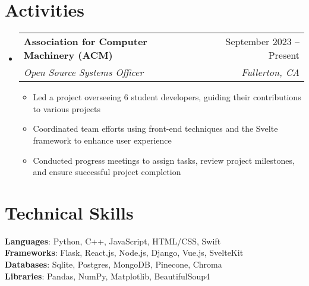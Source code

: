 \documentclass[letterpaper,11pt]{article}
\makeatletter
\newcommand{\resumeItem}[1]{
  \item\small{
    {#1 \vspace{-2pt}}
  }
}
\newcommand{\resumeSubheading}[4]{
  \vspace{-2pt}\item
    \begin{tabular*}{0.97\textwidth}[t]{l@{\extracolsep{\fill}}r}
      \textbf{#1} & #2 \\
      \textit{\small#3} & \textit{\small #4} \\
    \end{tabular*}\vspace{-7pt}
}
\newcommand{\resumeSubHeadingListStart}{\begin{itemize}[leftmargin=0.15in, label={}]}
\newcommand{\resumeSubHeadingListEnd}{\end{itemize}}
\newcommand{\resumeItemListStart}{\begin{itemize}}
\newcommand{\resumeItemListEnd}{\end{itemize}\vspace{-5pt}}
\makeatother
\begin{document}
\section{Activities}
  \resumeSubHeadingListStart

\resumeSubheading
  {Association for Computer Machinery (ACM)}{September 2023 -- Present}
  {Open Source Systems Officer}{Fullerton, CA}
  \resumeItemListStart
    \resumeItem{Led a project overseeing 6 student developers, guiding their contributions to various projects}
    \resumeItem{Coordinated team efforts using front-end techniques and the Svelte framework to enhance user experience}
    \resumeItem{Conducted progress meetings to assign tasks, review project milestones, and ensure successful project completion}
\resumeItemListEnd



  \resumeSubHeadingListEnd

%
\section{Technical Skills}
 \begin{itemize}[leftmargin=0.15in, label={}]
    \small{\item{
     \textbf{Languages}{: Python, C++, JavaScript, HTML/CSS, Swift } \\
     \textbf{Frameworks}{: Flask, React.js, Node.js, Django, Vue.js, SvelteKit } \\
     \textbf{Databases}{: Sqlite, Postgres, MongoDB, Pinecone, Chroma} \\
     \textbf{Libraries}{: Pandas, NumPy, Matplotlib, BeautifulSoup4} \\
    }}
 \end{itemize}


\end{document}

